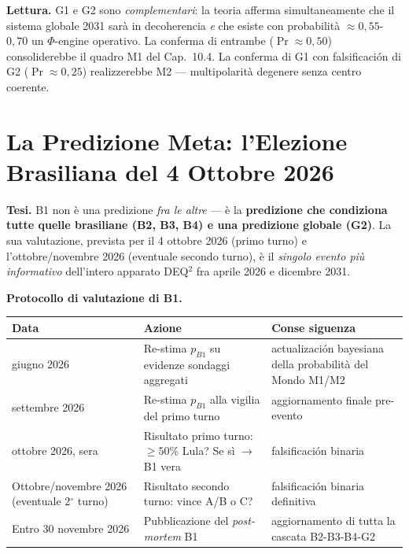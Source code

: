 \Hypoth{} \textbf{Lettura.} G1 e G2 sono \emph{complementari}: la teoria
afferma simultaneamente che il sistema globale 2031 sarà in decoherencia
\emph{e} che esiste con probabilità \(\approx 0{,}55\)-\(0{,}70\) un
\(\Phi\)-engine operativo. La conferma di entrambe
(\(\Pr \approx 0{,}50\)) consoliderebbe il quadro M1 del Cap.~10.4. La
conferma di G1 con falsificación di G2 (\(\Pr \approx 0{,}25\))
realizzerebbe M2 --- multipolarità degenere senza centro coerente.



\section{La Predizione Meta: l'Elezione Brasiliana del 4 Ottobre
2026}\label{la-predizione-meta-lelezione-brasileña-del-4-ottobre-2026}

\Hypoth{} \textbf{Tesi.} B1 non è una predizione \emph{fra le altre} ---
è la \textbf{predizione che condiziona tutte quelle brasiliane (B2, B3,
B4) e una predizione globale (G2)}. La sua valutazione, prevista per il
4 ottobre 2026 (primo turno) e l'ottobre/novembre 2026 (eventuale
secondo turno), è il \emph{singolo evento più informativo} dell'intero
apparato DEQ$^2$ fra aprile 2026 e dicembre 2031.

\Proved{} \textbf{Protocollo di valutazione di B1.}

{\def\LTcaptype{none} %
{\small\begin{longtable}[]{@{}
  >{\raggedright\arraybackslash}p{}
  >{\raggedright\arraybackslash}p{}
  >{\raggedright\arraybackslash}p{}@{}}
\toprule\noalign{}
\begin{minipage}[b]{\linewidth}\raggedright
Data
\end{minipage} & \begin{minipage}[b]{\linewidth}\raggedright
Azione
\end{minipage} & \begin{minipage}[b]{\linewidth}\raggedright
Conse siguenza
\end{minipage} \\
\midrule\noalign{}
\endhead
\bottomrule\noalign{}
\endlastfoot
30 giugno 2026 & Re-stima \(p_{B1}\) su evidenze sondaggi aggregati &
actualización bayesiana della probabilità del Mondo M1/M2 \\
30 settembre 2026 & Re-stima \(p_{B1}\) alla vigilia del primo turno &
aggiornamento finale pre-evento \\
4 ottobre 2026, sera & Risultato primo turno: \(\geq 50\%\) Lula? Se sì
$\to$ B1 vera & falsificación binaria \\
Ottobre/novembre 2026 (eventuale 2$^\circ$ turno) & Risultato secondo turno:
vince A/B o C? & falsificación binaria definitiva \\
Entro 30 novembre 2026 & Pubblicazione del \emph{post-mortem} B1 &
aggiornamento di tutta la cascata B2-B3-B4-G2 \\
\end{longtable}}
}


